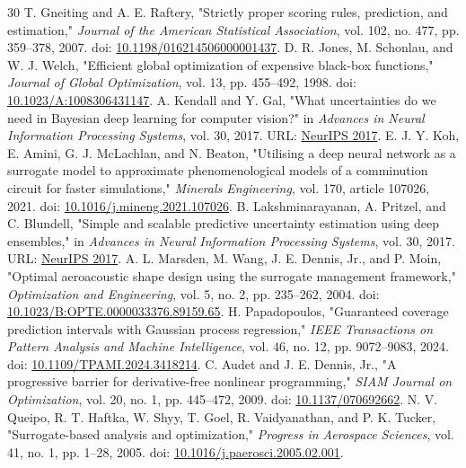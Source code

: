 \documentclass[10pt]{article}
\begin{document}
\begin{thebibliography}{30}
 T. Gneiting and A. E. Raftery, "Strictly proper scoring rules, prediction, and estimation," \emph{Journal of the American Statistical Association}, vol. 102, no. 477, pp. 359--378, 2007. doi: \href{https://doi.org/10.1198/016214506000001437}{10.1198/016214506000001437}.
 D. R. Jones, M. Schonlau, and W. J. Welch, "Efficient global optimization of expensive black-box functions," \emph{Journal of Global Optimization}, vol. 13, pp. 455--492, 1998. doi: \href{https://doi.org/10.1023/A:1008306431147}{10.1023/A:1008306431147}.
 A. Kendall and Y. Gal, "What uncertainties do we need in Bayesian deep learning for computer vision?" in \emph{Advances in Neural Information Processing Systems}, vol. 30, 2017. URL: \href{https://proceedings.neurips.cc/paper_files/paper/2017/hash/2650d6089a6d640c5e85b2b88265dc2b-Abstract.html}{NeurIPS 2017}.
 E. J. Y. Koh, E. Amini, G. J. McLachlan, and N. Beaton, "Utilising a deep neural network as a surrogate model to approximate phenomenological models of a comminution circuit for faster simulations," \emph{Minerals Engineering}, vol. 170, article 107026, 2021. doi: \href{https://doi.org/10.1016/j.mineng.2021.107026}{10.1016/j.mineng.2021.107026}.
 B. Lakshminarayanan, A. Pritzel, and C. Blundell, "Simple and scalable predictive uncertainty estimation using deep ensembles," in \emph{Advances in Neural Information Processing Systems}, vol. 30, 2017. URL: \href{https://proceedings.neurips.cc/paper_files/paper/2017/hash/9ef2ed4b7fd2c810847ffa5fa85bce38-Abstract.html}{NeurIPS 2017}.
 A. L. Marsden, M. Wang, J. E. Dennis, Jr., and P. Moin, "Optimal aeroacoustic shape design using the surrogate management framework," \emph{Optimization and Engineering}, vol. 5, no. 2, pp. 235--262, 2004. doi: \href{https://doi.org/10.1023/B:OPTE.0000033376.89159.65}{10.1023/B:OPTE.0000033376.89159.65}.
 H. Papadopoulos, "Guaranteed coverage prediction intervals with Gaussian process regression," \emph{IEEE Transactions on Pattern Analysis and Machine Intelligence}, vol. 46, no. 12, pp. 9072--9083, 2024. doi: \href{https://doi.org/10.1109/TPAMI.2024.3418214}{10.1109/TPAMI.2024.3418214}.
 C. Audet and J. E. Dennis, Jr., "A progressive barrier for derivative-free nonlinear programming," \emph{SIAM Journal on Optimization}, vol. 20, no. 1, pp. 445--472, 2009. doi: \href{https://doi.org/10.1137/070692662}{10.1137/070692662}.
 N. V. Queipo, R. T. Haftka, W. Shyy, T. Goel, R. Vaidyanathan, and P. K. Tucker, "Surrogate-based analysis and optimization," \emph{Progress in Aerospace Sciences}, vol. 41, no. 1, pp. 1--28, 2005. doi: \href{https://doi.org/10.1016/j.paerosci.2005.02.001}{10.1016/j.paerosci.2005.02.001}.

\end{thebibliography}
\end{document}
